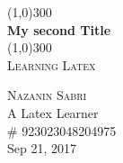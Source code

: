 \documentclass{article}
\begin{document}
\begin{titlepage}
	\begin{center}

	\line(1,0){300}\\
	[0.25in]
	\huge{\bfseries My second Title}\\
	[2mm]
	\line(1,0){300}\\
	[0.75cm]
	\textsc{\large Learning Latex}\\
	[10cm]
	\end{center}

	\begin{flushright}
	\textsc{\large Nazanin Sabri\\}
	A Latex Learner\\
	\# 923023048204975\\
	Sep 21, 2017
	\end{flushright}

\end{titlepage}
\end{document}
